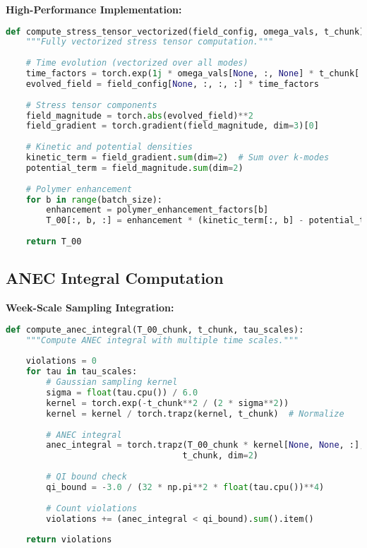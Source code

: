 \documentclass[11pt]{article}
\begin{document}
\textbf{High-Performance Implementation:}
\begin{lstlisting}[language=Python]
def compute_stress_tensor_vectorized(field_config, omega_vals, t_chunk):
    """Fully vectorized stress tensor computation."""
    
    # Time evolution (vectorized over all modes)
    time_factors = torch.exp(1j * omega_vals[None, :, None] * t_chunk[:, None, None])
    evolved_field = field_config[None, :, :, :] * time_factors
    
    # Stress tensor components
    field_magnitude = torch.abs(evolved_field)**2
    field_gradient = torch.gradient(field_magnitude, dim=3)[0]
    
    # Kinetic and potential densities
    kinetic_term = field_gradient.sum(dim=2)  # Sum over k-modes
    potential_term = field_magnitude.sum(dim=2)
    
    # Polymer enhancement
    for b in range(batch_size):
        enhancement = polymer_enhancement_factors[b]
        T_00[:, b, :] = enhancement * (kinetic_term[:, b] - potential_term[:, b])
    
    return T_00
\end{lstlisting}

\subsection{ANEC Integral Computation}

\textbf{Week-Scale Sampling Integration:}
\begin{lstlisting}[language=Python]
def compute_anec_integral(T_00_chunk, t_chunk, tau_scales):
    """Compute ANEC integral with multiple time scales."""
    
    violations = 0
    for tau in tau_scales:
        # Gaussian sampling kernel
        sigma = float(tau.cpu()) / 6.0
        kernel = torch.exp(-t_chunk**2 / (2 * sigma**2))
        kernel = kernel / torch.trapz(kernel, t_chunk)  # Normalize
        
        # ANEC integral
        anec_integral = torch.trapz(T_00_chunk * kernel[None, None, :], 
                                   t_chunk, dim=2)
        
        # QI bound check
        qi_bound = -3.0 / (32 * np.pi**2 * float(tau.cpu())**4)
        
        # Count violations
        violations += (anec_integral < qi_bound).sum().item()
    
    return violations
\end{lstlisting}
\end{document}
